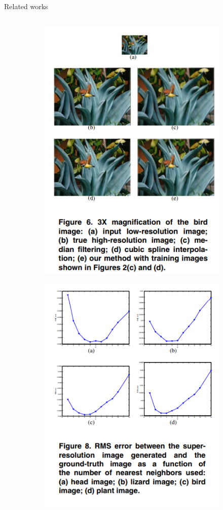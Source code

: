 \documentclass[
    xcolor={svgnames},
    hyperref={colorlinks,citecolor=OrangeRed,linkcolor=OrangeRed,urlcolor=DarkBlue}
    ]{beamer}
\begin{document}
\begin{frame}{Related works}
{\begin{columns}
\begin{column}{0.5\textwidth}
                \begin{figure}
                    \centering
                    \begin{subfigure}[l]{0.55\textwidth}
                        \vspace*{-50px}
                        \includegraphics[height=0.30\textheight, keepaspectratio]{result-neighbour-embedding.png}
                    \end{subfigure}
                    \begin{subfigure}[l]{0.55\textwidth}
                        \includegraphics[height=0.30\textheight, keepaspectratio]{rms-neighbour-embedding.png}                    

\end{subfigure}
\end{figure}
\end{column}
\end{columns}}
\end{frame}
\end{document}
